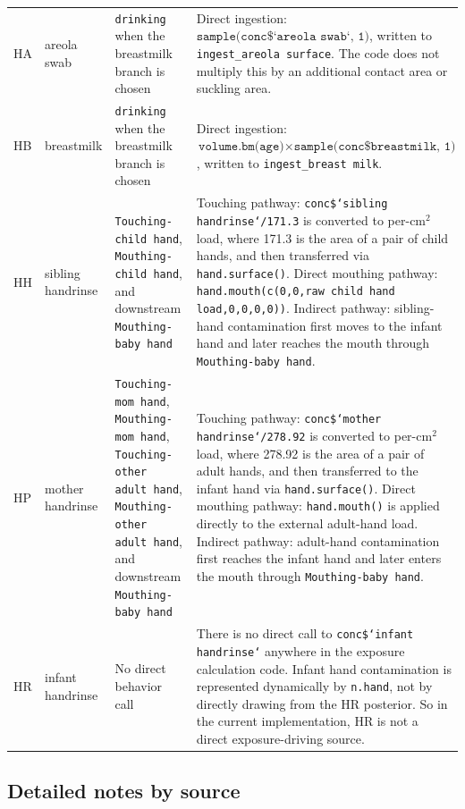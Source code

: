 \documentclass[11pt]{article}
\begin{document}
\begin{longtable}{p{1.2cm}p{2.5cm}p{3.4cm}p{6.8cm}}
HA & areola swab & \texttt{drinking} when the breastmilk branch is chosen & Direct ingestion: \(\texttt{sample(conc\$`areola swab`, 1)}\), written to \texttt{ingest\_areola surface}. The code does not multiply this by an additional contact area or suckling area. \\
HB & breastmilk & \texttt{drinking} when the breastmilk branch is chosen & Direct ingestion: \(\texttt{volume.bm(age)} \times \texttt{sample(conc\$breastmilk, 1)}\), written to \texttt{ingest\_breast milk}. \\
HH & sibling handrinse & \texttt{Touching-child hand}, \texttt{Mouthing-child hand}, and downstream \texttt{Mouthing-baby hand} & Touching pathway: \texttt{conc\$`sibling handrinse`/171.3} is converted to per-\(\mathrm{cm}^2\) load, where 171.3 is the area of a pair of child hands, and then transferred via \texttt{hand.surface()}. Direct mouthing pathway: \texttt{hand.mouth(c(0,0,raw child hand load,0,0,0,0))}. Indirect pathway: sibling-hand contamination first moves to the infant hand and later reaches the mouth through \texttt{Mouthing-baby hand}. \\
HP & mother handrinse & \texttt{Touching-mom hand}, \texttt{Mouthing-mom hand}, \texttt{Touching-other adult hand}, \texttt{Mouthing-other adult hand}, and downstream \texttt{Mouthing-baby hand} & Touching pathway: \texttt{conc\$`mother handrinse`/278.92} is converted to per-\(\mathrm{cm}^2\) load, where 278.92 is the area of a pair of adult hands, and then transferred to the infant hand via \texttt{hand.surface()}. Direct mouthing pathway: \texttt{hand.mouth()} is applied directly to the external adult-hand load. Indirect pathway: adult-hand contamination first reaches the infant hand and later enters the mouth through \texttt{Mouthing-baby hand}. \\
HR & infant handrinse & No direct behavior call & There is no direct call to \texttt{conc\$`infant handrinse`} anywhere in the exposure calculation code. Infant hand contamination is represented dynamically by \texttt{n.hand}, not by directly drawing from the HR posterior. So in the current implementation, HR is not a direct exposure-driving source. \\
\bottomrule
\end{longtable}

\subsection{Detailed notes by source}
\end{document}
